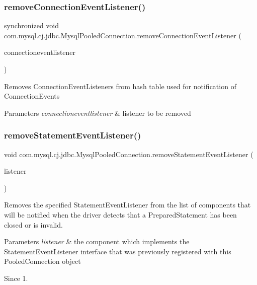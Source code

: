 \subsubsection{\texorpdfstring{remove\+Connection\+Event\+Listener()}{removeConnectionEventListener()}}
{\footnotesize\ttfamily synchronized void com.\+mysql.\+cj.\+jdbc.\+Mysql\+Pooled\+Connection.\+remove\+Connection\+Event\+Listener (\begin{DoxyParamCaption}\item[{Connection\+Event\+Listener}]{connectioneventlistener }\end{DoxyParamCaption})}

Removes Connection\+Event\+Listeners from hash table used for notification of Connection\+Events


\begin{DoxyParams}{Parameters}
{\em connectioneventlistener} & listener to be removed \\
\hline
\end{DoxyParams}
\mbox{\label{classcom_1_1mysql_1_1cj_1_1jdbc_1_1_mysql_pooled_connection_a9f58a333cb514007a999c93879dcfe51}} 
\subsubsection{\texorpdfstring{remove\+Statement\+Event\+Listener()}{removeStatementEventListener()}}
{\footnotesize\ttfamily void com.\+mysql.\+cj.\+jdbc.\+Mysql\+Pooled\+Connection.\+remove\+Statement\+Event\+Listener (\begin{DoxyParamCaption}\item[{Statement\+Event\+Listener}]{listener }\end{DoxyParamCaption})}

Removes the specified {\ttfamily Statement\+Event\+Listener} from the list of components that will be notified when the driver detects that a {\ttfamily Prepared\+Statement} has been closed or is invalid.


\begin{DoxyParams}{Parameters}
{\em listener} & the component which implements the {\ttfamily Statement\+Event\+Listener} interface that was previously registered with this {\ttfamily Pooled\+Connection} object\\
\hline
\end{DoxyParams}
\begin{DoxySince}{Since}
1. 
\end{DoxySince}


